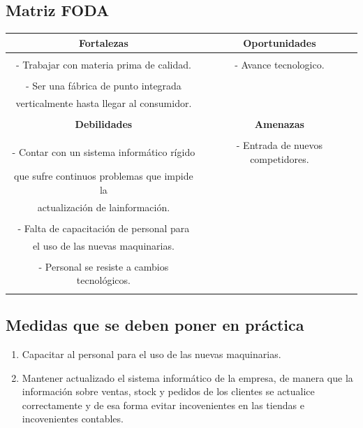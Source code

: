 \documentclass[a4paper,10pt,titlepage]{article}
\begin{document}
\subsection{Matriz FODA}
  \begin{tabular}{|c|c|}
    \hline 
      \textbf{Fortalezas} & \textbf{Oportunidades} \\ \hline
& \\
- Trabajar con materia prima de calidad. 
& - Avance tecnologico.\\
&\\
- Ser una f\'abrica de punto integrada & \\verticalmente hasta llegar al consumidor. &\\ &\\

\hline 
    \textbf{Debilidades} & \textbf{Amenazas} \\
\hline     
&\\
- Contar con un sistema inform\'atico r\'igido& - Entrada de nuevos competidores. \\que sufre continuos problemas que impide la &\\ actualizaci\'on de lainformaci\'on. &\\
&\\
- Falta de capacitaci\'on de personal para &\\el uso de las nuevas maquinarias. &\\
&\\
- Personal se resiste a cambios tecnol\'ogicos. &\\&\\ 
 \hline    
  \end{tabular}

  
\subsection{Medidas que se deben poner en pr\'actica}
 \begin{enumerate}
 \item Capacitar al personal para el uso de las nuevas maquinarias.
 \item Mantener actualizado el sistema inform\'atico de la empresa, de manera que la informaci\'on sobre ventas, stock y pedidos de los clientes se actualice correctamente y de esa forma evitar incovenientes en las tiendas e incovenientes contables.
\end{enumerate} 
\end{document}
